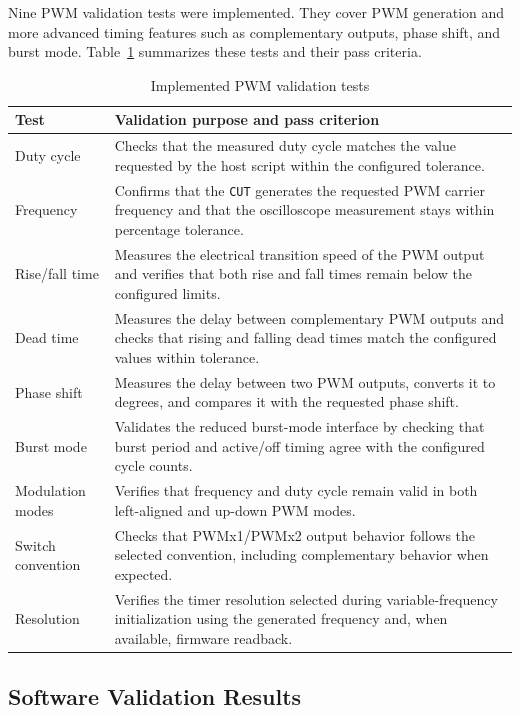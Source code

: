 Nine PWM validation tests were implemented. They cover PWM
generation and more advanced timing features such as complementary
outputs, phase shift, and burst mode. Table~\ref{tab:implemented_pwm_tests}
summarizes these tests and their pass criteria.

\begin{table}[H]
\centering
\caption{Implemented PWM validation tests}
\label{tab:implemented_pwm_tests}
\small
\begin{tabularx}{\textwidth}{|p{3.5cm}|X|}
\hline
\textbf{Test} & \textbf{Validation purpose and pass criterion} \\ \hline
Duty cycle & Checks that the measured duty cycle matches the value requested by the host script within the configured tolerance. \\ \hline
Frequency & Confirms that the \texttt{CUT} generates the requested PWM carrier frequency and that the oscilloscope measurement stays within percentage tolerance. \\ \hline
Rise/fall time & Measures the electrical transition speed of the PWM output and verifies that both rise and fall times remain below the configured limits. \\ \hline
Dead time & Measures the delay between complementary PWM outputs and checks that rising and falling dead times match the configured values within tolerance. \\ \hline
Phase shift & Measures the delay between two PWM outputs, converts it to degrees, and compares it with the requested phase shift. \\ \hline
Burst mode & Validates the reduced burst-mode interface by checking that burst period and active/off timing agree with the configured cycle counts. \\ \hline
Modulation modes & Verifies that frequency and duty cycle remain valid in both left-aligned and up-down PWM modes. \\ \hline
Switch convention & Checks that PWMx1/PWMx2 output behavior follows the selected convention, including complementary behavior when expected. \\ \hline
Resolution & Verifies the timer resolution selected during variable-frequency initialization using the generated frequency and, when available, firmware readback. \\ \hline
\end{tabularx}
\normalsize
\end{table}

\subsection{Software Validation Results}
\label{software-validation-results}

